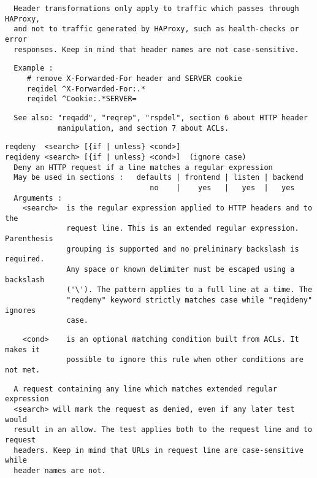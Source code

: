\begin{verbatim}
  Header transformations only apply to traffic which passes through HAProxy,
  and not to traffic generated by HAProxy, such as health-checks or error
  responses. Keep in mind that header names are not case-sensitive.
\end{verbatim}

\begin{verbatim}
  Example :
     # remove X-Forwarded-For header and SERVER cookie
     reqidel ^X-Forwarded-For:.*
     reqidel ^Cookie:.*SERVER=
\end{verbatim}

\begin{verbatim}
  See also: "reqadd", "reqrep", "rspdel", section 6 about HTTP header
            manipulation, and section 7 about ACLs.
\end{verbatim}

\begin{verbatim}
reqdeny  <search> [{if | unless} <cond>]
reqideny <search> [{if | unless} <cond>]  (ignore case)
  Deny an HTTP request if a line matches a regular expression
  May be used in sections :   defaults | frontend | listen | backend
                                 no    |    yes   |   yes  |   yes
  Arguments :
    <search>  is the regular expression applied to HTTP headers and to the
              request line. This is an extended regular expression. Parenthesis
              grouping is supported and no preliminary backslash is required.
              Any space or known delimiter must be escaped using a backslash
              ('\'). The pattern applies to a full line at a time. The
              "reqdeny" keyword strictly matches case while "reqideny" ignores
              case.
\end{verbatim}

\begin{verbatim}
    <cond>    is an optional matching condition built from ACLs. It makes it
              possible to ignore this rule when other conditions are not met.
\end{verbatim}

\begin{verbatim}
  A request containing any line which matches extended regular expression
  <search> will mark the request as denied, even if any later test would
  result in an allow. The test applies both to the request line and to request
  headers. Keep in mind that URLs in request line are case-sensitive while
  header names are not.
\end{verbatim}


